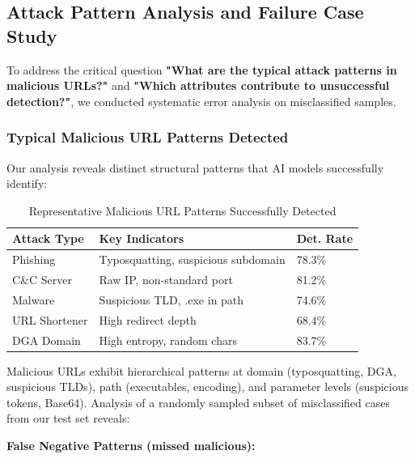 \documentclass[conference]{IEEEtran}
\begin{document}
\subsection{Attack Pattern Analysis and Failure Case Study}

To address the critical question \textbf{"What are the typical attack patterns in malicious URLs?"} and \textbf{"Which attributes contribute to unsuccessful detection?"}, we conducted systematic error analysis on misclassified samples.

\subsubsection{Typical Malicious URL Patterns Detected}

Our analysis reveals distinct structural patterns that AI models successfully identify:

\begin{table}[htbp]
\centering
\caption{Representative Malicious URL Patterns Successfully Detected}
\label{tab:attack_patterns}
{\small
\begin{tabular}{lp{3cm}l}
\toprule
Attack Type & Key Indicators & Det. Rate \\
\midrule
Phishing & Typosquatting, suspicious subdomain & 78.3\% \\
C\&C Server & Raw IP, non-standard port & 81.2\% \\
Malware & Suspicious TLD, .exe in path & 74.6\% \\
URL Shortener & High redirect depth & 68.4\% \\
DGA Domain & High entropy, random chars & 83.7\% \\
\bottomrule
\end{tabular}
}
\end{table}

Malicious URLs exhibit hierarchical patterns at domain (typosquatting, DGA, suspicious TLDs), path (executables, encoding), and parameter levels (suspicious tokens, Base64). Analysis of a randomly sampled subset of misclassified cases from our test set reveals:

\textbf{False Negative Patterns (missed malicious):}
\end{document}
